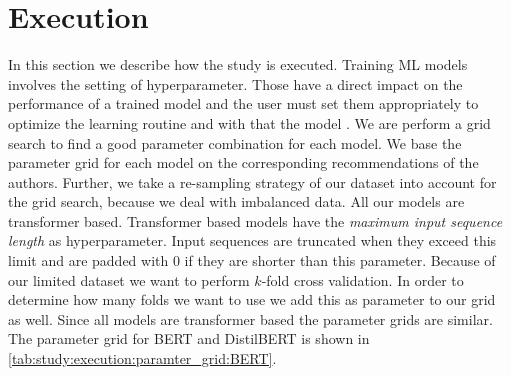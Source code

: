 \section{Execution}
\label{chp:study:sec:execution}
In this section we describe how the study is executed.
Training \ac{ML} models involves the setting of hyperparameter.
Those have a direct impact on the performance of a trained model and the user must set them appropriately to optimize the learning routine and with that the model \parencite{Claesen:2015}.
We are perform a grid search to find a good parameter combination for each model.
We base the parameter grid for each model on the corresponding recommendations of the authors.
Further, we take a re-sampling strategy of our dataset into account for the grid search, because we deal with imbalanced data.
All our models are transformer based.
Transformer based models have the \textit{maximum input sequence length} as hyperparameter.
Input sequences are truncated when they exceed this limit and are padded with 0 if they are shorter than this parameter.
Because of our limited dataset we want to perform $k$-fold cross validation.
In order to determine how many folds we want to use we add this as parameter to our grid as well.
Since all models are transformer based the parameter grids are similar.
The parameter grid for \ac{BERT} and \ac{DistilBERT} is shown in \cref{tab:study:execution:paramter_grid:BERT}.
